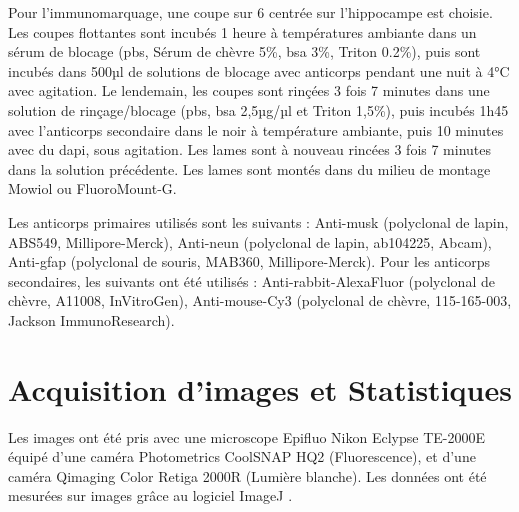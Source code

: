 	Pour l'immunomarquage, une coupe sur 6 centrée sur l'hippocampe est choisie. Les coupes flottantes sont incubés 1 heure à températures ambiante dans un sérum de blocage (\gls{pbs}, Sérum de chèvre 5\%, \gls{bsa} 3\%, Triton 0.2\%), puis sont incubés dans 500µl de solutions de blocage avec anticorps pendant une nuit à 4°C avec agitation. Le lendemain, les coupes sont rinçées 3 fois 7 minutes dans une solution de rinçage/blocage (\gls{pbs}, \gls{bsa} 2,5µg/µl et Triton 1,5\%), puis incubés 1h45 avec l'anticorps secondaire dans le noir à température ambiante, puis 10 minutes avec du \gls{dapi}, sous agitation. Les lames sont à nouveau rincées 3 fois 7 minutes dans la solution précédente. Les lames sont montés dans du milieu de montage Mowiol ou FluoroMount-G.
	
	Les anticorps primaires utilisés sont les suivants : Anti-\acrshort{musk} (polyclonal de lapin, ABS549, Millipore-Merck),  Anti-\acrshort{neun} (polyclonal de lapin, ab104225, Abcam), Anti-\acrshort{gfap} (polyclonal de souris, MAB360, Millipore-Merck). Pour les anticorps secondaires, les suivants ont été utilisés : Anti-rabbit-AlexaFluor (polyclonal de chèvre, A11008, InVitroGen), Anti-mouse-Cy3 (polyclonal de chèvre, 115-165-003, Jackson ImmunoResearch).
	
\section{Acquisition d'images et Statistiques}
\label{sec:ImagesStats}
	Les images ont été pris avec une microscope Epifluo Nikon Eclypse TE-2000E équipé d'une caméra Photometrics CoolSNAP HQ2 (Fluorescence), et d'une caméra Qimaging Color Retiga 2000R (Lumière blanche).
	Les données ont été mesurées sur images grâce au logiciel ImageJ \cite{Schneider2012}.